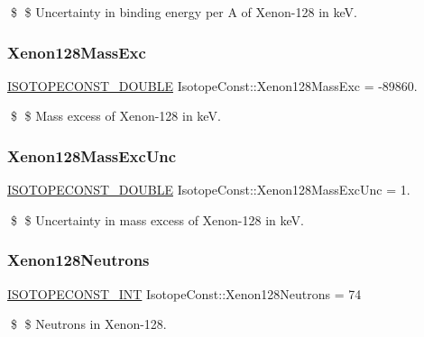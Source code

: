\$ \$ Uncertainty in binding energy per A of Xenon-\/128 in keV. \mbox{\label{group___isotope_const-_xenon-_xe128_gacfa2da2bebcbfe3b46b44493c6855540}} 
\subsubsection{\texorpdfstring{Xenon128\+Mass\+Exc}{Xenon128MassExc}}
{\footnotesize\ttfamily \mbox{\hyperlink{group___isotope_const-_macros_ga8f45a7272ce02c0b4c65c44636ed719a}{I\+S\+O\+T\+O\+P\+E\+C\+O\+N\+S\+T\+\_\+\+D\+O\+U\+B\+LE}} Isotope\+Const\+::\+Xenon128\+Mass\+Exc = -\/89860.}

\$ \$ Mass excess of Xenon-\/128 in keV. \mbox{\label{group___isotope_const-_xenon-_xe128_gafccb28e50906b3a06345f07f8faeb5b0}} 
\subsubsection{\texorpdfstring{Xenon128\+Mass\+Exc\+Unc}{Xenon128MassExcUnc}}
{\footnotesize\ttfamily \mbox{\hyperlink{group___isotope_const-_macros_ga8f45a7272ce02c0b4c65c44636ed719a}{I\+S\+O\+T\+O\+P\+E\+C\+O\+N\+S\+T\+\_\+\+D\+O\+U\+B\+LE}} Isotope\+Const\+::\+Xenon128\+Mass\+Exc\+Unc = 1.}

\$ \$ Uncertainty in mass excess of Xenon-\/128 in keV. \mbox{\label{group___isotope_const-_xenon-_xe128_ga51f56c114e9dd19c054579d3ec489ee0}} 
\subsubsection{\texorpdfstring{Xenon128\+Neutrons}{Xenon128Neutrons}}
{\footnotesize\ttfamily \mbox{\hyperlink{group___isotope_const-_macros_ga5f18360b3e99483a35c32d789e62621c}{I\+S\+O\+T\+O\+P\+E\+C\+O\+N\+S\+T\+\_\+\+I\+NT}} Isotope\+Const\+::\+Xenon128\+Neutrons = 74}

\$ \$ Neutrons in Xenon-\/128. \mbox{\label{group___isotope_const-_xenon-_xe128_gad4f48dca0818da8b5f1e5d842a1f52cc}} 
